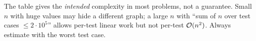 \begin{warningbox}
The table gives the \emph{intended} complexity in most problems, not a guarantee. Small $n$ with huge values may hide a different graph; a large $n$ with ``sum of $n$ over test cases $\le 2\cdot10^5$'' allows per-test linear work but not per-test $\mathcal{O}(n^2)$. Always estimate with the worst test case.
\end{warningbox}
